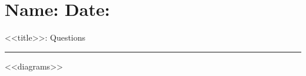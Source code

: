 \documentclass[leqno, 12pt]{article}
\def \HeadingQuestions {\section*{\Large Name: \underline{\hspace{8cm}} \hfill Date: \underline{\hspace{3cm}}} \vspace{-3mm}
{<<title>>: Questions} \vspace{1pt}\hrule}
\begin{document}
    \HeadingQuestions
    \vspace{-5mm}
    \begin{multicols}{2}
        <<diagrams>>
    \end{multicols}
\end{document}
